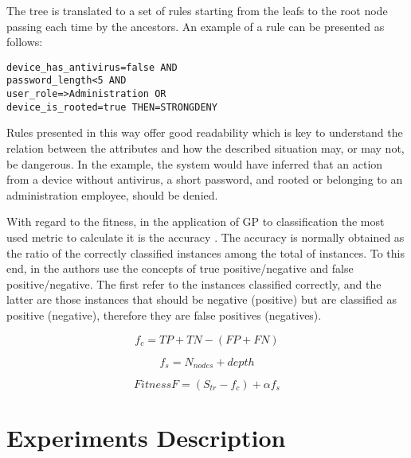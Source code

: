 \documentclass[a4paper,10pt,twocolumn,preprint,3p]{elsarticle}
\begin{document}
The tree is translated to a set of rules starting from the leafs to the root node passing each time by the ancestors. An example of a rule can be presented as follows:

\begin{verbatim}
device_has_antivirus=false AND
password_length<5 AND
user_role=>Administration OR
device_is_rooted=true THEN=STRONGDENY
\end{verbatim}

Rules presented in this way offer good readability which is key to understand the relation between the attributes and how the described situation may, or may not, be dangerous. In the example, the system would have inferred that an action from a device without antivirus, a short password, and rooted or belonging to an administration employee, should be denied.

With regard to the fitness, in the application of GP to classification the most used metric to calculate it is the accuracy \cite{espejo2010survey}. The accuracy is normally obtained as the ratio of the correctly classified instances among the total of instances. To this end, in \cite{witten2005data} the authors use the concepts of true positive/negative and false positive/negative. The first refer to the instances classified correctly, and the latter are those instances that should be negative (positive) but are classified as positive (negative), therefore they are false positives (negatives). %



\begin{equation}
f_{c} = TP + TN - (FP + FN)
\end{equation}

\begin{equation}
f_{s} = N_{nodes} + depth
\end{equation}

\begin{equation}
Fitness F = (S_{tr} - f_{c}) + \alpha f_{s}
\end{equation}

\section{Experiments Description}
\label{sec:experiments}
\end{document}
